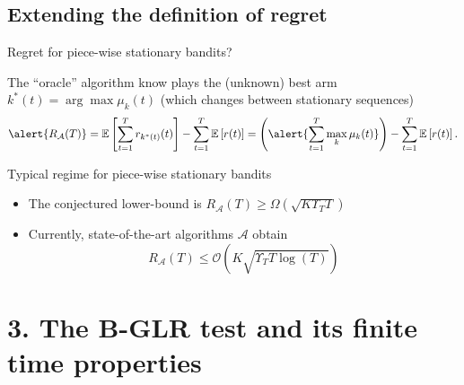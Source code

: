 \documentclass[11pt,english,ignorenonframetext,]{beamer}
\begin{document}
\subsection{\hfill{}Extending the definition of regret\hfill{}}

\begin{frame}{Regret for piece-wise stationary bandits?}

  The ``oracle'' algorithm know plays the (unknown) best arm $k^*(t) = \arg\max \mu_k(t)$
  (which changes between stationary sequences)
  \[ \alert{ R_{\mathcal{A}}(T) } = \mathbb{E}\left[ \sum\limits_{t=1}^T r_{k^*(t)}(t) \right] - \sum\limits_{t=1}^T \mathbb{E}\left[ r(t) \right] = \left(\alert{\sum_{t=1}^T \max_k \mu_k(t)} \right) - \sum\limits_{t=1}^T \mathbb{E}\left[ r(t) \right]. \]

\pause
\vspace*{10pt}

\begin{exampleblock}{Typical regime for piece-wise stationary bandits}
  \begin{itemize}
  \item
  The conjectured lower-bound is
  $R_{\mathcal{A}}(T) \geq \Omega(\sqrt{K \Upsilon_T T})$

  \item
  Currently, state-of-the-art algorithms $\mathcal{A}$ obtain
  \[ R_{\mathcal{A}}(T) \leq \mathcal{O}(K \sqrt{\Upsilon_T T \log(T)}) \]
  \end{itemize}
\end{exampleblock}

\end{frame}


\section{\hfill{}3. The B-GLR test and its finite time properties\hfill{}}
\end{document}
